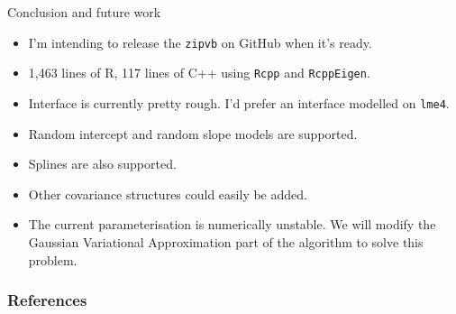 \documentclass{beamer}
\begin{document}
	\begin{frame}{Conclusion and future work}
		\begin{itemize}
			\item I'm intending to release the \texttt{zipvb} on GitHub when it's ready.
			\item 1,463 lines of R, 117 lines of C++ using \texttt{Rcpp} and \texttt{RcppEigen}.
			\item Interface is currently pretty rough. I'd prefer an interface modelled on \texttt{lme4}.
			\item Random intercept and random slope models are supported.
			\item Splines are also supported.
			\item Other covariance structures could easily be added.
			\item The current parameterisation is numerically unstable. We will modify the Gaussian
			      Variational Approximation part of the algorithm to solve this problem.
		\end{itemize}	
	\end{frame}
			
	\begin{frame}
		\frametitle{References}
		
		
	\end{frame}

			
\end{document}
